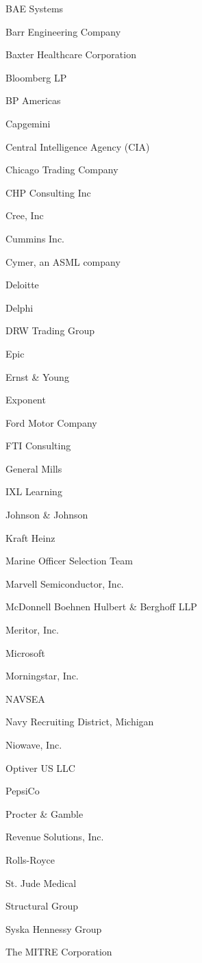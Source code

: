 \documentclass[twoside]{article}
\begin{document}
\begin{center}
\begin{multicols}{5}
\begin{FlushLeft}
\begin{compactitem}
\item BAE Systems
\item Barr Engineering Company
\item Baxter Healthcare Corporation
\item Bloomberg LP
\item BP Americas
\item Capgemini
\item Central Intelligence Agency (CIA)
\item Chicago Trading Company
\item CHP Consulting Inc
\item Cree, Inc
\item Cummins Inc.
\item Cymer, an ASML company
\item Deloitte
\item Delphi
\item DRW Trading Group
\item Epic
\item Ernst \& Young
\item Exponent
\item Ford Motor Company
\item FTI Consulting
\item General Mills
\item IXL Learning
\item Johnson \& Johnson
\item Kraft Heinz
\item Marine Officer Selection Team
\item Marvell Semiconductor, Inc.
\item McDonnell Boehnen Hulbert \& Berghoff LLP
\item Meritor, Inc.
\item Microsoft
\item Morningstar, Inc.
\item NAVSEA
\item Navy Recruiting District, Michigan
\item Niowave, Inc.
\item Optiver US LLC
\item PepsiCo
\item Procter \& Gamble
\item Revenue Solutions, Inc.
\item Rolls-Royce
\item St. Jude Medical
\item Structural Group
\item Syska Hennessy Group
\item The MITRE Corporation

\end{compactitem}
\end{FlushLeft}
\end{multicols}
\end{center}
\end{document}
